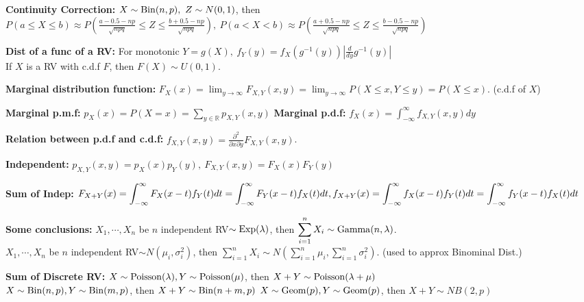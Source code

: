\documentclass[10pt, a4paper]{article}
\newcommand{\disp}{\displaystyle}
\begin{document}
\begin{spacing}{1}
    {\bf Continuity Correction: } $X\sim {\rm Bin}(n, p),\ Z\sim N(0,1)$, then\\
    $\disp P(a\le X\le b)\approx P\left(\frac{a-0.5-np}{\sqrt{npq}}\le Z\le \frac{b+0.5-np}{\sqrt{npq}}\right),\ 
    \disp P(a< X< b)\approx P\left(\frac{a+0.5-np}{\sqrt{npq}}\le Z\le \frac{b-0.5-np}{\sqrt{npq}}\right)$

    {\bf Dist of a func of a RV: } For monotonic $\disp Y=g(X),\ 
    f_Y(y)=f_X\left(g^{-1}(y)\right)\left|\frac{d}{dy} g^{-1}(y)\right|$\\
    If $X$ is a RV with c.d.f $F$, then $F(X)\sim U(0,1)$.

    \vspace{0.3in}
    {\bf Marginal distribution function:} 
    $\disp F_X(x)=\lim_{y\rightarrow \infty}F_{X,Y}(x,y)=
    \lim_{y\rightarrow \infty}P(X\le x, Y\le y)=P(X\le x).$ (c.d.f of $X$)

    {\bf Marginal p.m.f:} 
    $\disp p_X(x)=P(X=x)=\sum_{y\in \mathbb{R}} p_{X,Y}(x,y)$\qquad 
    {\bf Marginal p.d.f:}
    $\disp f_X(x)=\int_{-\infty}^{\infty} f_{X,Y}(x,y)dy$

    \newcommand{\pt}{\partial}
    {\bf Relation between p.d.f and c.d.f:}
    $\disp f_{X,Y}(x,y)=\frac{\pt^2}{\pt x\pt y}F_{X,Y}(x,y)$.

    {\bf Independent: }
    $\disp p_{X,Y}(x,y)=p_X(x)p_Y(y),\ F_{X,Y}(x,y)=F_X(x)F_Y(y)$

    {\bf Sum of Indep: }
    $\disp F_{X+Y}(x)=\int_{-\infty}^{\infty}F_X(x-t)f_Y(t)dt=\int_{-\infty}^{\infty}F_Y(x-t)f_X(t)dt,
    \\f_{X+Y}(x)=\int_{-\infty}^{\infty}f_X(x-t)f_Y(t)dt=\int_{-\infty}^{\infty}f_Y(x-t)f_X(t)dt$

    {\bf Some conclusions: }
    $X_1,\cdots, X_n$ be $n$ independent RV$\sim {\rm Exp}(\lambda)$, then 
    $\disp \sum_{i=1}^{n}X_i\sim {\rm Gamma}(n,\lambda)$.\\
    $X_1,\cdots, X_n$ be $n$ independent RV$\sim N(\mu_i,\sigma_i^2)$, then 
    $\disp \sum_{i=1}^{n}X_i\sim N\left(\sum_{i=1}^n \mu_i,\sum_{i=1}^n \sigma_i^2\right)$.
    (used to approx Binominal Dist.)

    {\bf Sum of Discrete RV: }
    $X\sim {\rm Poisson}(\lambda), Y\sim {\rm Poisson}(\mu)$, then $X+Y\sim {\rm Poisson}(\lambda+\mu)$\\
    $X\sim {\rm Bin}(n,p), Y\sim {\rm Bin}(m,p)$, then $X+Y\sim {\rm Bin}(n+m,p)$\quad 
    $X\sim {\rm Geom}(p), Y\sim {\rm Geom}(p)$, then $X+Y\sim NB(2,p)$


\end{spacing}
\end{document}
